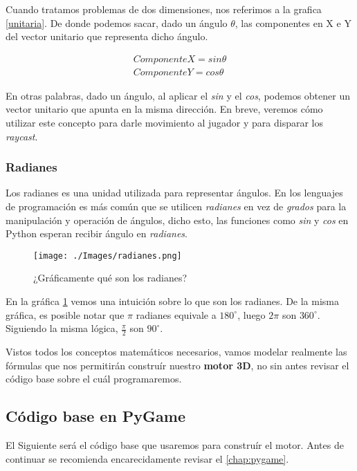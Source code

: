 Cuando tratamos problemas de dos dimensiones, nos referimos a la grafica \ref{unitaria}. De donde podemos sacar, dado un ángulo $\theta$, las componentes en X e Y del vector unitario que representa dicho ángulo.

\begin{equation}
\begin{aligned}
\label{unitvector}
ComponenteX = sin \theta \\
ComponenteY = cos \theta
\end{aligned}
\end{equation}

En otras palabras, dado un ángulo, al aplicar el \emph{sin} y el \emph{cos}, podemos obtener un vector unitario que apunta en la misma dirección. En breve, veremos cómo utilizar este concepto para darle movimiento al jugador y para disparar los \emph{raycast}.

\subsubsection{Radianes}

Los radianes es una unidad utilizada para representar ángulos. En los lenguajes de programación es más común que se utilicen \emph{radianes} en vez de \emph{grados} para la manipulación y operación de ángulos, dicho esto, las funciones como \emph{sin} y \emph{cos} en Python esperan recibir ángulo en \emph{radianes}. 

\begin{figure}[h!]
	\centering
	\texttt{[image: ./Images/radianes.png]}
	\caption{¿Gráficamente qué son los radianes?}
	\label{rads}
\end{figure}

En la gráfica \ref{rads} vemos una intuición sobre lo que son los radianes. De la misma gráfica, es posible notar que $\pi$ radianes equivale a $180^{\circ}
$, luego $2\pi$ son $360^{\circ}$. Siguiendo la misma lógica, $\frac{\pi}{2}$ son  $90^{\circ}$.


Vistos todos los conceptos matemáticos necesarios, vamos modelar realmente las fórmulas que nos permitirán construír nuestro \textbf{motor 3D}, no sin antes revisar el código base sobre el cuál programaremos.


\subsection{Código base en PyGame}

El Siguiente será el código base que usaremos para construír el motor. Antes de continuar se recomienda encarecidamente revisar el \autoref{chap:pygame}.

